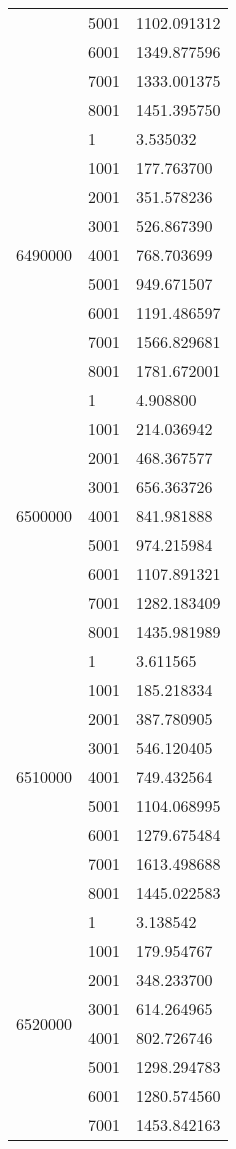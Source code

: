 \begin{table}[htb!]
\begin{tabular}{lll}
 & 5001 & 1102.091312 \\
 & 6001 & 1349.877596 \\
 & 7001 & 1333.001375 \\
 & 8001 & 1451.395750 \\
\multirow[c]{9}{*}{6490000} & 1 & 3.535032 \\
 & 1001 & 177.763700 \\
 & 2001 & 351.578236 \\
 & 3001 & 526.867390 \\
 & 4001 & 768.703699 \\
 & 5001 & 949.671507 \\
 & 6001 & 1191.486597 \\
 & 7001 & 1566.829681 \\
 & 8001 & 1781.672001 \\
\multirow[c]{9}{*}{6500000} & 1 & 4.908800 \\
 & 1001 & 214.036942 \\
 & 2001 & 468.367577 \\
 & 3001 & 656.363726 \\
 & 4001 & 841.981888 \\
 & 5001 & 974.215984 \\
 & 6001 & 1107.891321 \\
 & 7001 & 1282.183409 \\
 & 8001 & 1435.981989 \\
\multirow[c]{9}{*}{6510000} & 1 & 3.611565 \\
 & 1001 & 185.218334 \\
 & 2001 & 387.780905 \\
 & 3001 & 546.120405 \\
 & 4001 & 749.432564 \\
 & 5001 & 1104.068995 \\
 & 6001 & 1279.675484 \\
 & 7001 & 1613.498688 \\
 & 8001 & 1445.022583 \\
\multirow[c]{9}{*}{6520000} & 1 & 3.138542 \\
 & 1001 & 179.954767 \\
 & 2001 & 348.233700 \\
 & 3001 & 614.264965 \\
 & 4001 & 802.726746 \\
 & 5001 & 1298.294783 \\
 & 6001 & 1280.574560 \\
 & 7001 & 1453.842163 \\

\end{tabular}
\end{table}
